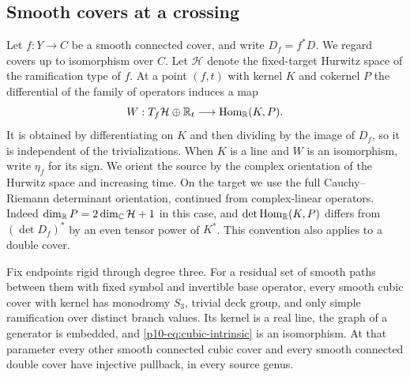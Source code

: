\subsection{Smooth covers at a crossing}\label{p10-sec:incidence}

Let $f:Y\to C$ be a smooth connected cover, and write $D_f=f^*D$.
We regard covers up to isomorphism over $C$. Let $\mathcal H$ denote
the fixed-target Hurwitz space of the ramification type of $f$.
At a point $(f,t)$ with kernel $K$ and cokernel $P$ the differential
of the family of operators induces a map
\begin{equation}\label{p10-eq:cubic-intrinsic}
 W:T_f\mathcal H\oplus\mathbb R_t\longrightarrow
                  \operatorname{Hom}_{\mathbb R}(K,P).
\end{equation}
It is obtained by differentiating on $K$ and then dividing by the
image of $D_f$, so it is independent of the trivializations. When
$K$ is a line and $W$ is an isomorphism, write $\eta_f$ for its sign.
We orient the source by the complex orientation of the Hurwitz space
and increasing time. On the target we use the full Cauchy--Riemann
determinant orientation, continued from complex-linear operators.
Indeed $\dim_{\mathbb R}P=2\dim_{\mathbb C}\mathcal H+1$ in this case, and
$\det\operatorname{Hom}_{\mathbb R}(K,P)$ differs from
$(\det D_f)^*$ by an even tensor power of $K^*$. This convention
also applies to a double cover.

\begin{proposition}\label{p10-prop:incidence}
Fix endpoints rigid through degree three. For a residual set of smooth
paths between them with fixed symbol and invertible base operator,
every smooth cubic cover with kernel has monodromy $S_3$, trivial deck
group, and only simple ramification over distinct branch values. Its
kernel is a real line, the graph of a generator is embedded, and
\eqref{p10-eq:cubic-intrinsic} is an isomorphism. At that parameter every
other smooth connected cubic cover and every smooth connected double
cover have injective pullback, in every source genus.
\end{proposition}

